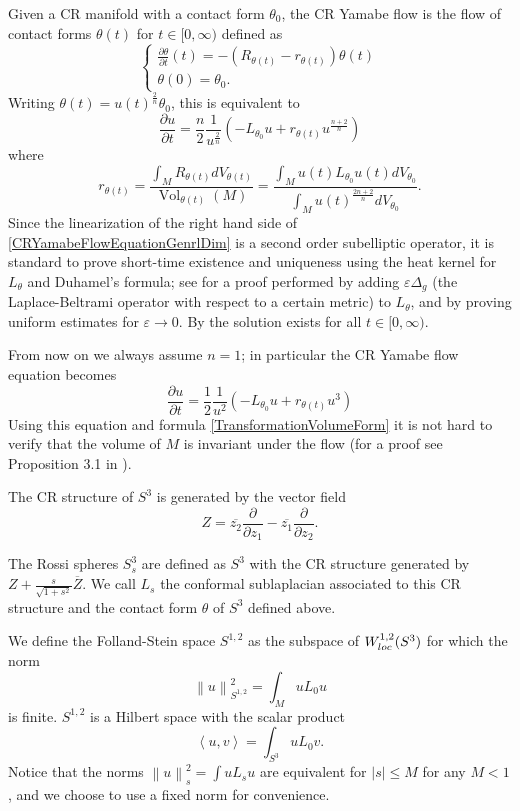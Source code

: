\documentclass[10pt,a4paper]{amsart}
\newcommand{\de}{\partial}
\newcommand{\rosso}[1]{{\color{red}#1}}
\newcommand{\N}[1]{\left\lVert#1\right\rVert}
\newcommand{\bra}{\left\langle}
\newcommand{\ket}{\right\rangle}
\newcommand{\e}{\varepsilon}
\DeclareMathOperator{\Vol}{Vol}
\begin{document}
Given a CR manifold with a contact form $\theta_0$, the CR Yamabe flow is the flow of contact forms $\theta(t)$ for $t\in[0,\infty)$ defined as
$$\left\{\begin{matrix}
    \frac{\de\theta}{\de t}(t) = -(R_{\theta(t)}-r_{\theta(t)})\theta(t)\\
    \theta(0)=\theta_0.
\end{matrix}\right.$$
Writing $\theta(t)=u(t)^{\frac{2}{n}}\theta_0$, this is equivalent to
\begin{equation}\label{CRYamabeFlowEquationGenrlDim}
 \frac{\de u}{\de t} = \frac{n}{2}\frac{1}{u^{\frac{2}{n}}}\left(-L_{\theta_0}u +r_{\theta(t)}u^{\frac{n+2}{n}} \right)
\end{equation}
where
$$r_{\theta(t)}=\frac{\int_MR_{\theta(t)}dV_{\theta(t)}}{\Vol_{\theta(t)}(M)} = \frac{\int_Mu(t)L_{\theta_0}u(t)dV_{\theta_0}}{\int_Mu(t)^{\frac{2n+2}{n}}dV_{\theta_0}}.$$
Since the linearization of the right hand side of \eqref{CRYamabeFlowEquationGenrlDim} is a second order subelliptic operator, it is standard to prove short-time existence and uniqueness using the heat kernel for $L_{\theta}$ and Duhamel's formula; see \cite{Z} for a proof performed by adding $\e\Delta_{g}$ (the Laplace-Beltrami operator with respect to a certain metric) to $L_{\theta}$, and by proving uniform estimates for $\e\to 0$. By \cite{H-LTexistence} the solution exists for all $t\in[0,\infty)$.

From now on we always assume $n=1$; in particular the CR Yamabe flow equation becomes
\begin{equation}\label{CRYamabeFlowEquation}
 \frac{\de u}{\de t} = \frac{1}{2}\frac{1}{u^2}\left(-L_{\theta_0}u +r_{\theta(t)}u^3 \right)
\end{equation}
Using this equation and formula \eqref{TransformationVolumeForm} it is not hard to verify that the volume of $M$ is invariant under the flow (for a proof see Proposition 3.1 in \cite{H-LTexistence}).

The CR structure of $S^3$ is generated by the vector field
$$Z= \overline{z_2}\frac{\de}{\de z_1} - \overline{z_1}\frac{\de}{\de z_2}.$$

The Rossi spheres $S^3_s$ are defined as $S^3$ with the CR structure generated by $Z+\frac{s}{\sqrt{1+s^2}}\overline{Z}$.
We call $L_s$ the conformal sublaplacian associated to this CR structure and the contact form $\theta$ of $S^3$ defined above.

We define the Folland-Stein space $S^{1,2}$ %
as the subspace of $W^{1,2}_{\rm{loc}}(S^3)$ for which the norm
$$\N{u}_{S^{1,2}}^2 = \int_MuL_0u$$
is finite. $S^{1,2}$ is a Hilbert space with the scalar product
$$\bra u,v\ket = \int_{S^3}uL_0v.$$
Notice that the norms $\N{u}_s^2 = \int uL_su$ are equivalent for $|s|\le M$ for any $M<1$, and we choose to use a fixed norm for convenience.
\end{document}
